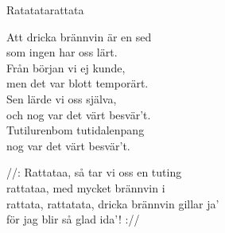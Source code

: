 \begin{song}{Ratatata}{rattata}
\begin{vers}
Att dricka brännvin är en sed\\
som ingen har oss lärt.\\
Från början vi ej kunde,\\
men det var blott temporärt.\\
Sen lärde vi oss själva,\\
och nog var det värt besvär't.\\
Tutilurenbom tutidalenpang\\
nog var det värt besvär't.\\
\end{vers}
\begin{vers}
//: Rattataa, så tar vi oss en tuting\\
rattataa, med mycket brännvin i\\
rattata, rattatata, dricka brännvin gillar ja'\\
för jag blir så glad ida'! ://\\
\end{vers}
\end{song}
